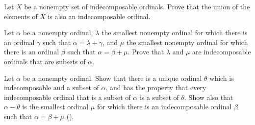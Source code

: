 \documentclass{article}
\begin{document}
\begin{exercise}
  \label{exe:6bo4uirh}
  Let \(X\) be a nonempty set of indecomposable ordinals.  Prove that
  the union of the elements of \(X\) is also an indecomposable
  ordinal.
\end{exercise}

\begin{exercise}
  \label{exe:vmlhobjb}
  Let \(\alpha\) be a nonempty ordinal, \(\lambda\) the smallest
  nonempty ordinal for which there is an ordinal \(\gamma\) such that
  \(\alpha = \lambda + \gamma\), and \(\mu\) the smallest nonempty
  ordinal for which there is an ordinal \(\beta\) such that
  \(\alpha = \beta + \mu\).  Prove that \(\lambda\) and \(\mu\) are
  indecomposable ordinals that are subsets of \(\alpha\).
\end{exercise}

\begin{exercise}
  \label{exe:726wa6d5}
  Let \(\alpha\) be a nonempty ordinal.  Show that there is a unique
  ordinal \(\theta\) which is indecomposable and a subset of
  \(\alpha\), and has the property that every indecomposable ordinal
  that is a subset of \(\alpha\) is a subset of \(\theta\).  Show also
  that \(\alpha - \theta\) is the smallest ordinal \(\mu\) for which
  there is an indecomposable ordinal \(\beta\) such that
  \(\alpha = \beta + \mu\) ().
\end{exercise}
\end{document}
